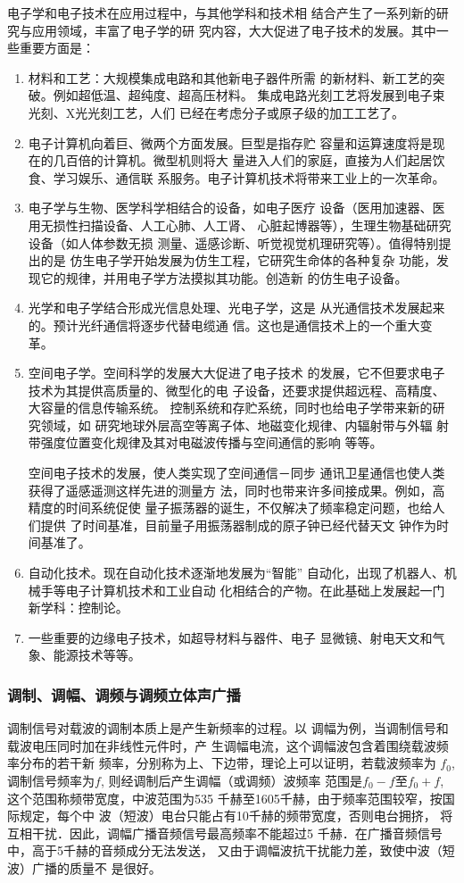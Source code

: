 电子学和电子技术在应用过程中，与其他学科和技术相
结合产生了一系列新的研究与应用领域，丰富了电子学的研
究内容，大大促进了电子技术的发展。其中一些重要方面是：
\begin{enumerate}
\item 材料和工艺：大规模集成电路和其他新电子器件所需
的新材料、新工艺的突破。例如超低温、超纯度、超高压材料。
集成电路光刻工艺将发展到电子束光刻、X光光刻工艺，人们
已经在考虑分子或原子级的加工工艺了。
\item 电子计算机向着巨、微两个方面发展。巨型是指存贮
容量和运算速度将是现在的几百倍的计算机。微型机则将大
量进入人们的家庭，直接为人们起居饮食、学习娱乐、通信联
系服务。电子计算机技术将带来工业上的一次革命。
\item 电子学与生物、医学科学相结合的设备，如电子医疗
设备（医用加速器、医用无损性扫描设备、人工心肺、人工肾、
心脏起博器等），生理生物基础研究设备（如人体参数无损
测量、遥感诊断、听觉视觉机理研究等）。值得特别提出的是
仿生电子学开始发展为仿生工程，它研究生命体的各种复杂
功能，发现它的规律，并用电子学方法摸拟其功能。创造新
的仿生电子设备。
\item 光学和电子学结合形成光信息处理、光电子学，这是
从光通信技术发展起来的。预计光纤通信将逐步代替电缆通
信。这也是通信技术上的一个重大变革。
\item 空间电子学。空间科学的发展大大促进了电子技术
的发展，它不但要求电子技术为其提供高质量的、微型化的电
子设备，还要求提供超远程、高精度、大容量的信息传输系统。
控制系统和存贮系统，同时也给电子学带来新的研究领域，如
研究地球外层高空等离子体、地磁变化规律、内辐射带与外辐
射带强度位置变化规律及其对电磁波传播与空间通信的影响
等等。

空间电子技术的发展，使人类实现了空间通信－同步
通讯卫星通信也使人类获得了遥感遥测这样先进的测量方
法，同时也带来许多间接成果。例如，高精度的时间系统促使
量子振荡器的诞生，不仅解决了频率稳定问题，也给人们提供
了时间基准，目前量子用振荡器制成的原子钟已经代替天文
钟作为时间基准了。
\item 自动化技术。现在自动化技术逐渐地发展为“智能”
自动化，出现了机器人、机械手等电子计算机技术和工业自动
化相结合的产物。在此基础上发展起一门新学科：控制论。
\item 一些重要的边缘电子技术，如超导材料与器件、电子
显微镜、射电天文和气象、能源技术等等。
\end{enumerate}

\subsubsection{调制、调幅、调频与调频立体声广播}
调制信号对载波的调制本质上是产生新频率的过程。以
调幅为例，当调制信号和载波电压同时加在非线性元件时，产
生调幅电流，这个调幅波包含着围绕载波频率分布的若干新
频率，分别称为上、下边带，理论上可以证明，若载波频率为
$f_0$, 调制信号频率为$f$, 则经调制后产生调幅（或调频）波频率
范围是$f_0-f$至$f_0+f$, 这个范围称频带宽度，中波范围为535
千赫至1605千赫，由于频率范围较窄，按国际规定，每个中
波（短波）电台只能占有10千赫的频带宽度，否则电台拥挤，
将互相干扰．因此，调幅广播音频信号最高频率不能超过5
千赫．在广播音频信号中，高于5千赫的音频成分无法发送，
又由于调幅波抗干扰能力差，致使中波（短波）广播的质量不
是很好。

